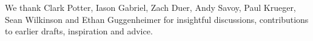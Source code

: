 \documentclass[11pt]{article}
\newcommand{\new}[1]{\textcolor{teal}{#1}}
\begin{document}
We thank Clark Potter, Iason Gabriel, Zach Duer, Andy Savoy, Paul Krueger, Sean Wilkinson and Ethan Guggenheimer for insightful discussions, contributions to earlier drafts, inspiration and advice.





\end{document}
